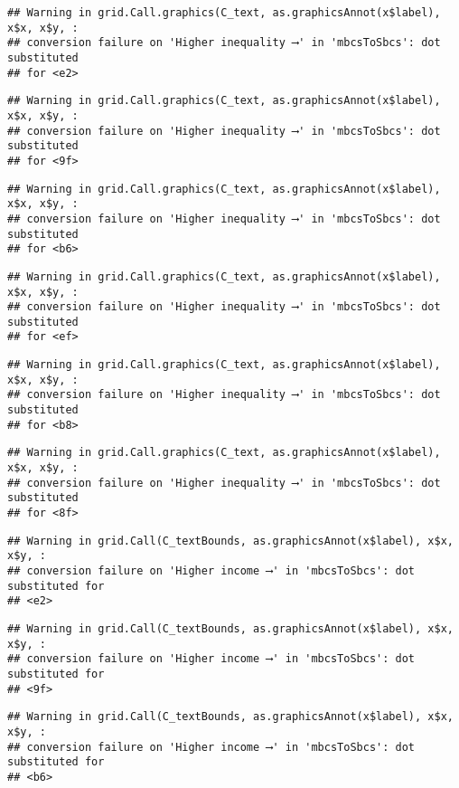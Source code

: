 \documentclass[
]{article}
\begin{document}
\begin{verbatim}
## Warning in grid.Call.graphics(C_text, as.graphicsAnnot(x$label), x$x, x$y, :
## conversion failure on 'Higher inequality ⟶️' in 'mbcsToSbcs': dot substituted
## for <e2>
\end{verbatim}

\begin{verbatim}
## Warning in grid.Call.graphics(C_text, as.graphicsAnnot(x$label), x$x, x$y, :
## conversion failure on 'Higher inequality ⟶️' in 'mbcsToSbcs': dot substituted
## for <9f>
\end{verbatim}

\begin{verbatim}
## Warning in grid.Call.graphics(C_text, as.graphicsAnnot(x$label), x$x, x$y, :
## conversion failure on 'Higher inequality ⟶️' in 'mbcsToSbcs': dot substituted
## for <b6>
\end{verbatim}

\begin{verbatim}
## Warning in grid.Call.graphics(C_text, as.graphicsAnnot(x$label), x$x, x$y, :
## conversion failure on 'Higher inequality ⟶️' in 'mbcsToSbcs': dot substituted
## for <ef>
\end{verbatim}

\begin{verbatim}
## Warning in grid.Call.graphics(C_text, as.graphicsAnnot(x$label), x$x, x$y, :
## conversion failure on 'Higher inequality ⟶️' in 'mbcsToSbcs': dot substituted
## for <b8>
\end{verbatim}

\begin{verbatim}
## Warning in grid.Call.graphics(C_text, as.graphicsAnnot(x$label), x$x, x$y, :
## conversion failure on 'Higher inequality ⟶️' in 'mbcsToSbcs': dot substituted
## for <8f>
\end{verbatim}

\begin{verbatim}
## Warning in grid.Call(C_textBounds, as.graphicsAnnot(x$label), x$x, x$y, :
## conversion failure on 'Higher income ⟶️' in 'mbcsToSbcs': dot substituted for
## <e2>
\end{verbatim}

\begin{verbatim}
## Warning in grid.Call(C_textBounds, as.graphicsAnnot(x$label), x$x, x$y, :
## conversion failure on 'Higher income ⟶️' in 'mbcsToSbcs': dot substituted for
## <9f>
\end{verbatim}

\begin{verbatim}
## Warning in grid.Call(C_textBounds, as.graphicsAnnot(x$label), x$x, x$y, :
## conversion failure on 'Higher income ⟶️' in 'mbcsToSbcs': dot substituted for
## <b6>
\end{verbatim}
\end{document}
